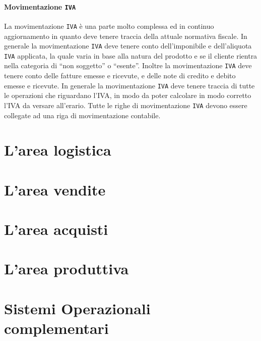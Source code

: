     \paragraph{Movimentazione \texttt{IVA}} La movimentazione \texttt{IVA} è una parte molto complessa ed in continuo aggiornamento in quanto deve tenere traccia della attuale normativa fiscale. In generale la movimentazione \texttt{IVA} deve tenere conto dell'imponibile e dell'aliquota \texttt{IVA} applicata, la quale varia in base alla natura del prodotto e se il cliente rientra nella categoria di ``non soggetto'' o ``esente''. Inoltre la movimentazione \texttt{IVA} deve tenere conto delle fatture emesse e ricevute, e delle note di credito e debito emesse e ricevute. In generale la movimentazione \texttt{IVA} deve tenere traccia di tutte le operazioni che riguardano l'IVA, in modo da poter calcolare in modo corretto l'IVA da versare all'erario. Tutte le righe di movimentazione \texttt{IVA} devono essere collegate ad una riga di movimentazione contabile.
\section{L'area logistica}

\section{L'area vendite}

\section{L'area acquisti}

\section{L'area produttiva}

\section{Sistemi Operazionali complementari}